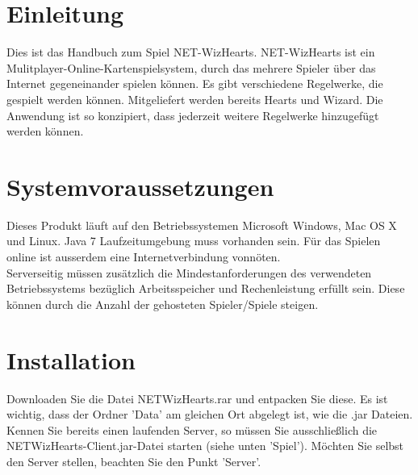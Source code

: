 \documentclass[titlepage,10pt,a4paper]{article}
\begin{document}
\newpage
 
\section{Einleitung}
Dies ist das Handbuch zum Spiel NET-WizHearts. NET-WizHearts ist ein Mulitplayer-Online-Kartenspielsystem, durch das mehrere Spieler über das Internet gegeneinander spielen können. Es gibt verschiedene Regelwerke, die gespielt werden können. Mitgeliefert werden bereits Hearts und Wizard. Die Anwendung ist so konzipiert, dass jederzeit weitere \gls{Regelwerk}e hinzugefügt werden können.

\section{Systemvoraussetzungen}
Dieses Produkt läuft auf den Betriebssystemen Microsoft Windows, Mac OS X und Linux. Java 7 Laufzeitumgebung muss vorhanden sein. Für das Spielen online ist ausserdem eine Internetverbindung vonnöten. \\
\gls{Server}seitig müssen zusätzlich die Mindestanforderungen des verwendeten Betriebssystems bezüglich Arbeitsspeicher und Rechenleistung erfüllt sein. Diese können durch die Anzahl der gehosteten Spieler/Spiele steigen.

\section{Installation}
Downloaden Sie die Datei NETWizHearts.rar und entpacken Sie diese. Es ist wichtig, dass der Ordner 'Data' am gleichen Ort abgelegt ist, wie die .jar Dateien. Kennen Sie bereits einen laufenden Server, so müssen Sie ausschließlich die NETWizHearts-Client.jar-Datei starten (siehe unten 'Spiel'). Möchten Sie selbst den Server stellen, beachten Sie den Punkt 'Server'.
\end{document}
